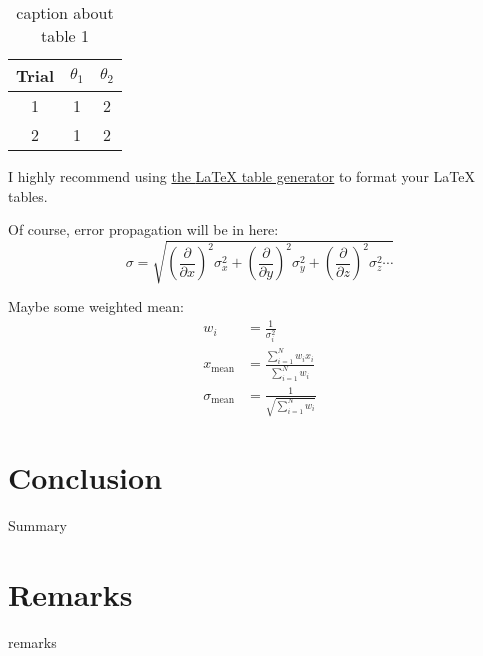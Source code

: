 \documentclass[11pt,oneside,letterpaper]{article} %
\begin{document}
\begin{table}[H]
\centering
\begin{tabular}{|c|c|c|}
	\hline
	Trial & $\theta_1$ & $\theta_2$  \\ \hline
	1 & 1 & 2 \\ \hline
	2 & 1 & 2 \\ \hline
	\end{tabular}
	\caption{caption about table 1}
	\label{tbl:data}
\end{table}

I highly recommend using \href{http://www.tablesgenerator.com/latex_tables}{the {\LaTeX} table generator} to format your {\LaTeX} tables.
\newline

Of course, error propagation will be in here:
\begin{equation}
    \sigma = \sqrt{\left(\frac{\partial}{\partial x}\right)^2\sigma _x^2+\left(\frac{\partial}{\partial y}\right)^2\sigma _y^2 + \left(\frac{\partial}{\partial z}\right)^2\sigma _z^2\cdots} 
\end{equation}

Maybe some weighted mean:
\begin{align*} %
    w_i &= \frac{1}{\sigma_i^2}\\
    x_{\text{mean}} &= \frac{\sum\limits_{i=1}^N{w_ix_i}}{\sum\limits_{i=1}^N{w_i}}\\
    \sigma_{\text{mean}} &= \frac{1}{\sqrt{\sum\limits_{i=1}^N{w_i}}}
\end{align*}



\section{Conclusion}
Summary



\section{Remarks}
remarks
\end{document}
